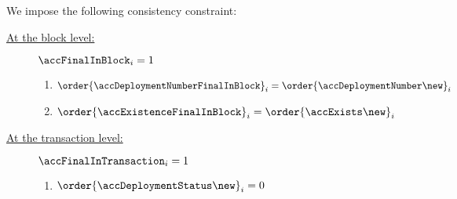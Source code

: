 We impose the following consistency constraint:
\begin{description}
	\item[\underline{At the block level:}]
		\If $\accFinalInBlock _{i} = 1$ \Then
		\begin{enumerate}
			\item $\order{\accDeploymentNumberFinalInBlock} _{i} = \order{\accDeploymentNumber\new} _{i}$
			\item $\order{\accExistenceFinalInBlock}        _{i} = \order{\accExists\new}           _{i}$
		\end{enumerate}
		\item[\underline{At the transaction level:}]
			\If $\accFinalInTransaction _{i} = 1$ \Then
		\begin{enumerate}
			\item $\order{\accDeploymentStatus\new} _{i} = 0$
		\end{enumerate}
\end{description}
